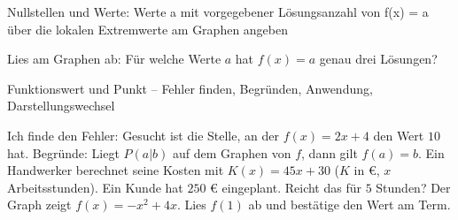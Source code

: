 \begin{aufgabe}{Nullstellen und Werte: Werte a mit vorgegebener Lösungsanzahl von f(x) = a über die lokalen Extremwerte am Graphen angeben}
\begin{teile}
\teil Lies am Graphen ab: Für welche Werte $a$ hat $f(x) = a$ genau drei Lösungen?

\begin{ksys}[xmin=-5,xmax=5,ymin=-20,ymax=20,ystep=4,ablesen]\end{ksys}
\end{teile}
\end{aufgabe}

\begin{aufgabe}{Funktionswert und Punkt – Fehler finden, Begründen, Anwendung, Darstellungswechsel}
\begin{teile}
\teil Ich finde den Fehler: Gesucht ist die Stelle, an der $f(x) = 2x + 4$ den Wert $10$ hat. 
\teil Begründe: Liegt $P(a | b)$ auf dem Graphen von $f$, dann gilt $f(a) = b$.
\teil Ein Handwerker berechnet seine Kosten mit $K(x) = 45x + 30$ ($K$ in €, $x$ Arbeitsstunden). Ein Kunde hat $250$ € eingeplant. Reicht das für $5$ Stunden?
\teil Der Graph zeigt $f(x) = -x^2 + 4x$. Lies $f(1)$ ab und bestätige den Wert am Term.

\begin{ksys}[xmin=-1,xmax=5,ymin=-2,ymax=5,ablesen]\end{ksys}
\end{teile}
\end{aufgabe}
